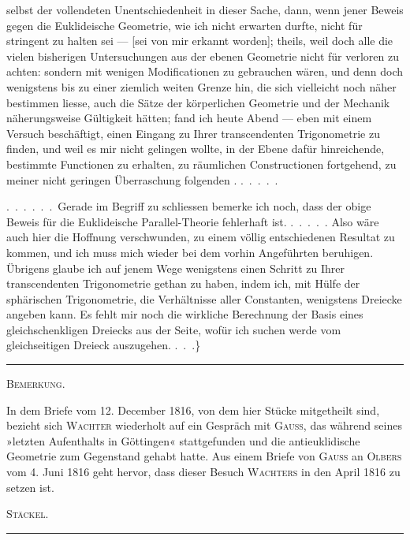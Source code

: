 selbst der vollendeten Unentschiedenheit in dieser Sache, dann, wenn jener
Beweis gegen die Euklideische Geometrie, wie ich nicht erwarten durfte, nicht
für stringent zu halten sei --- [sei von mir erkannt worden]; theils, weil doch
alle die vielen bisherigen Untersuchungen aus der ebenen Geometrie nicht für
verloren zu achten: sondern mit wenigen Modificationen zu gebrauchen wären,
und denn doch wenigstens bis zu einer ziemlich weiten Grenze hin, die sich
vielleicht noch näher bestimmen liesse, auch die Sätze der körperlichen
Geometrie und der Mechanik näherungsweise Gültigkeit hätten; fand ich heute
Abend --- eben mit einem Versuch beschäftigt, einen Eingang zu Ihrer
transcendenten Trigonometrie zu finden, und weil es mir nicht gelingen
wollte, in der Ebene dafür hinreichende, bestimmte Functionen zu erhalten,
zu räumlichen Constructionen fortgehend, zu meiner nicht geringen
Überraschung folgenden . .\ .\ .\ .\ .

.\ .\ .\ .\ .\ .\ Gerade im Begriff zu schliessen bemerke ich noch, dass der obige
Beweis für die Euklideische Parallel-Theorie fehlerhaft ist. .\ .\ .\ .\ . Also wäre
auch hier die Hoffnung verschwunden, zu einem völlig entschiedenen Resultat
zu kommen, und ich muss mich wieder bei dem vorhin Angeführten beruhigen.
Übrigens glaube ich auf jenem Wege wenigstens einen Schritt zu Ihrer
transcendenten Trigonometrie gethan zu haben, indem ich, mit Hülfe der
sphärischen Trigonometrie, die Verhältnisse aller Constanten, wenigstens
 Dreiecke angeben kann. Es fehlt mir
noch die wirkliche Berechnung der Basis eines gleichschenkligen Dreiecks aus
der Seite, wofür ich suchen werde vom gleichseitigen Dreieck auszugehen.
.\ .\ .\}

\begin{center}\rule{3cm}{0.4pt}\end{center}

\begin{center}\textsc{Bemerkung.}\end{center}

In dem Briefe vom 12. December 1816, von dem hier Stücke mitgetheilt sind,
bezieht sich \textsc{Wachter} wiederholt auf ein Gespräch mit \textsc{Gauss},
das während seines »letzten Aufenthalts in Göttingen« stattgefunden und die
antieuklidische Geometrie zum Gegenstand gehabt hatte. Aus einem Briefe von
\textsc{Gauss} an \textsc{Olbers} vom 4. Juni 1816 geht hervor, dass dieser
Besuch \textsc{Wachters} in den April 1816 zu setzen ist.

\begin{flushright}\textsc{Stäckel.}\end{flushright}

\begin{center}\rule{3cm}{0.4pt}\end{center}

